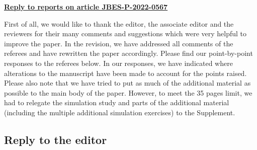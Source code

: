 \documentclass[a4paper,12pt]{article}
\begin{document}
\begin{center}
\underline{\Large\textbf{{Reply to reports on article JBES-P-2022-0567}}}\end{center}
\vspace{10pt}


First of all, we would like to thank the editor, the associate editor and the reviewers for their many comments and suggestions which were very helpful to improve the paper. In the revision, we have addressed all comments of the referees and have rewritten the paper accordingly.
Please find our point-by-point responses to the referees below. In our responses, we have indicated where alterations to the manuscript have been made to account for the points raised. Please also note that we have tried to put as much of the additional material as possible to the main body of the paper. However, to meet the 35 pages limit, we had to relegate the simulation study and parts of the additional material (including the multiple additional simulation exercises) to the Supplement. 



\subsection*{Reply to the editor}
\end{document}
